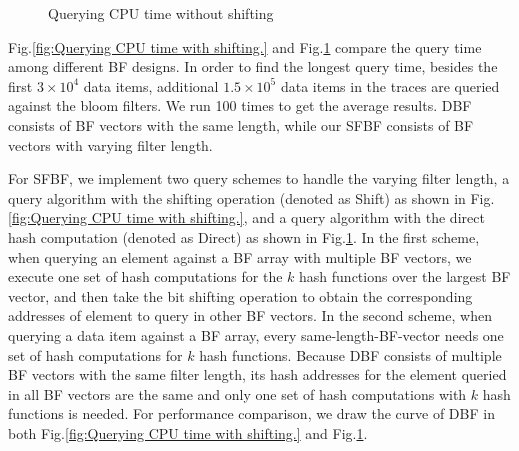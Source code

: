 \documentclass[10pt,journal,letterpaper]{IEEEtran}
\begin{document}
\begin{figure}[!htb]
{\label{fig:QueryingCPUtimewithoutshifting test1 actualdata webcache 1.}}
\caption{Querying CPU time without shifting}
\label{fig:Querying CPU time without shifting.}
\end{figure}




Fig.\ref{fig:Querying CPU time with shifting.} and Fig.\ref{fig:Querying CPU time without shifting.} compare the query time among different BF designs. In order to find the longest query time, besides the first $3 \times 10^4$ data items, additional $1.5 \times 10^5$ data items in the traces are queried against the bloom filters. We run 100 times to get the average results. DBF consists of BF vectors with the same length, while our SFBF consists of BF vectors with varying filter length.

For SFBF, we implement two query schemes to handle the varying filter length, a query algorithm with the shifting operation (denoted as Shift) as shown in Fig.\ref{fig:Querying CPU time with shifting.}, and a query algorithm with the direct hash computation (denoted as Direct) as shown in Fig.\ref{fig:Querying CPU time without shifting.}. In the first scheme, when querying an element against a BF array with multiple BF vectors, we execute one set of hash computations for the $k$ hash functions over the largest BF vector, and then take the bit shifting operation to obtain the corresponding addresses of element to query in other BF vectors. In the second scheme, when querying a data item against a BF array, every same-length-BF-vector needs one set of hash computations for $k$ hash functions. Because DBF consists of multiple BF vectors with the same filter length, its  hash addresses for the element queried in all BF vectors are the same and only one set of hash computations with $k$ hash functions is needed. For performance comparison, we draw the curve of DBF in both Fig.\ref{fig:Querying CPU time with shifting.} and Fig.\ref{fig:Querying CPU time without shifting.}.
\end{document}
